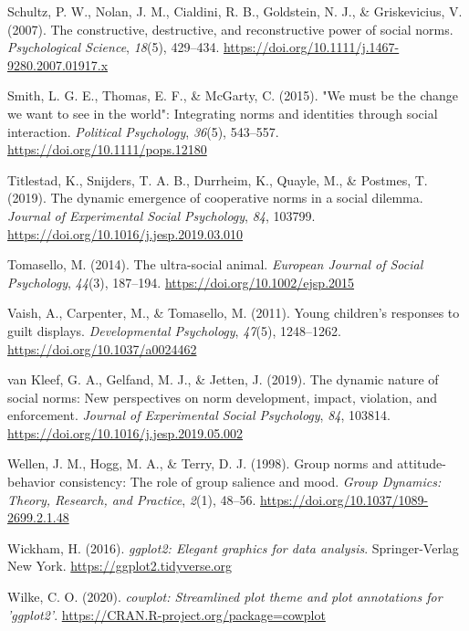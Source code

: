 \documentclass[
  english,
  man,floatsintext]{apa6}
\newlength{\cslhangindent}
\newlength{\cslentryspacingunit} %
\newenvironment{CSLReferences}[2] %
 {%
  \setlength{\parindent}{0pt}
  \ifodd #1
  \let\oldpar\par
  \def\par{\hangindent=\cslhangindent\oldpar}
  \fi
  \setlength{\parskip}{#2\cslentryspacingunit}
 }%
 {}
\begin{document}
\begin{CSLReferences}{1}{0}
\leavevmode{}%
Schultz, P. W., Nolan, J. M., Cialdini, R. B., Goldstein, N. J., \& Griskevicius, V. (2007). The constructive, destructive, and reconstructive power of social norms. \emph{Psychological Science}, \emph{18}(5), 429--434. \url{https://doi.org/10.1111/j.1467-9280.2007.01917.x}

\leavevmode{}%
Smith, L. G. E., Thomas, E. F., \& McGarty, C. (2015). "We must be the change we want to see in the world": Integrating norms and identities through social interaction. \emph{Political Psychology}, \emph{36}(5), 543--557. \url{https://doi.org/10.1111/pops.12180}

\leavevmode{}%
Titlestad, K., Snijders, T. A. B., Durrheim, K., Quayle, M., \& Postmes, T. (2019). The dynamic emergence of cooperative norms in a social dilemma. \emph{Journal of Experimental Social Psychology}, \emph{84}, 103799. \url{https://doi.org/10.1016/j.jesp.2019.03.010}

\leavevmode{}%
Tomasello, M. (2014). The ultra-social animal. \emph{European Journal of Social Psychology}, \emph{44}(3), 187--194. \url{https://doi.org/10.1002/ejsp.2015}

\leavevmode{}%
Vaish, A., Carpenter, M., \& Tomasello, M. (2011). Young children's responses to guilt displays. \emph{Developmental Psychology}, \emph{47}(5), 1248--1262. \url{https://doi.org/10.1037/a0024462}

\leavevmode{}%
van Kleef, G. A., Gelfand, M. J., \& Jetten, J. (2019). The dynamic nature of social norms: New perspectives on norm development, impact, violation, and enforcement. \emph{Journal of Experimental Social Psychology}, \emph{84}, 103814. \url{https://doi.org/10.1016/j.jesp.2019.05.002}

\leavevmode{}%
Wellen, J. M., Hogg, M. A., \& Terry, D. J. (1998). Group norms and attitude-behavior consistency: The role of group salience and mood. \emph{Group Dynamics: Theory, Research, and Practice}, \emph{2}(1), 48--56. \url{https://doi.org/10.1037/1089-2699.2.1.48}

\leavevmode{}%
Wickham, H. (2016). \emph{{ggplot2}: Elegant graphics for data analysis}. Springer-Verlag New York. \url{https://ggplot2.tidyverse.org}

\leavevmode{}%
Wilke, C. O. (2020). \emph{{cowplot}: Streamlined plot theme and plot annotations for 'ggplot2'}. \url{https://CRAN.R-project.org/package=cowplot}

\end{CSLReferences}
\end{document}

